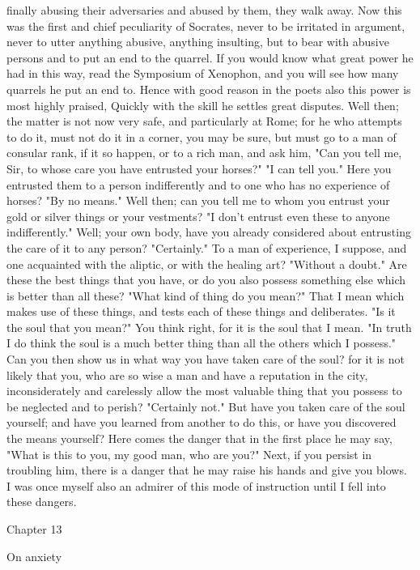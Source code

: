 \documentclass[a4paper]{article}
\begin{document}
finally abusing their adversaries and abused by them, they walk away.
    Now this was the first and chief peculiarity of Socrates, never to be
irritated in argument, never to utter anything abusive, anything insulting, but
to bear with abusive persons and to put an end to the quarrel. If you would
know what great power he had in this way, read the Symposium of Xenophon, and
you will see how many quarrels he put an end to. Hence with good reason in the
poets also this power is most highly praised,
       Quickly with the skill he settles great disputes.
    Well then; the matter is not now very safe, and particularly at Rome; for
he who attempts to do it, must not do it in a corner, you may be sure, but must
go to a man of consular rank, if it so happen, or to a rich man, and ask him,
"Can you tell me, Sir, to whose care you have entrusted your horses?" "I can
tell you." Here you entrusted them to a person indifferently and to one who has
no experience of horses? "By no means." Well then; can you tell me to whom you
entrust your gold or silver things or your vestments? "I don't entrust even
these to anyone indifferently." Well; your own body, have you already
considered about entrusting the care of it to any person? "Certainly." To a man
of experience, I suppose, and one acquainted with the aliptic, or with the
healing art? "Without a doubt." Are these the best things that you have, or do
you also possess something else which is better than all these? "What kind of
thing do you mean?" That I mean which makes use of these things, and tests each
of these things and deliberates. "Is it the soul that you mean?" You think
right, for it is the soul that I mean. "In truth I do think the soul is a much
better thing than all the others which I possess." Can you then show us in what
way you have taken care of the soul? for it is not likely that you, who are so
wise a man and have a reputation in the city, inconsiderately and carelessly
allow the most valuable thing that you possess to be neglected and to perish?
"Certainly not." But have you taken care of the soul yourself; and have you
learned from another to do this, or have you discovered the means yourself?
Here comes the danger that in the first place he may say, "What is this to you,
my good man, who are you?" Next, if you persist in troubling him, there is a
danger that he may raise his hands and give you blows. I was once myself also
an admirer of this mode of instruction until I fell into these dangers.

Chapter 13

On anxiety
\end{document}
